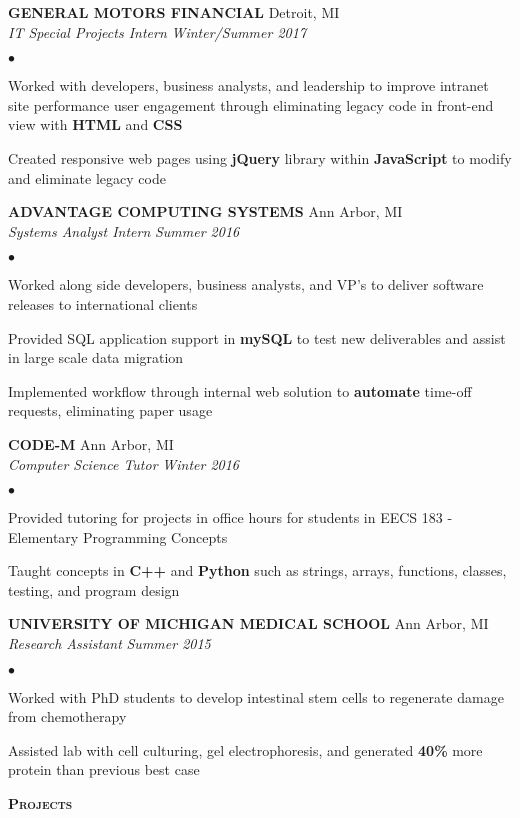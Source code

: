 \documentclass{article}
\newcommand{\lineunder}{\vspace*{-8pt} \\ \hspace*{-18pt} \hrulefill \\}
\newcommand{\header}[1]{{\hspace*{-15pt}\vspace*{6pt} \textsc{#1}} 
\vspace*{-6pt} \lineunder}
\newcommand{\employer}[4]{{ \textbf{\uppercase{#1}} \hfill#2\\ 
\emph{#3}} \hfill\textit{#4} \vspace*{1pt}}
\newenvironment{achievements}{\begin{list}{$\bullet$}{\topsep 0pt \itemsep 
-2pt}}{\vspace*{4pt}\end{list}}
\begin{document}
\employer{General Motors Financial}{Detroit, MI}
{IT Special Projects Intern}{Winter/Summer 2017}
	\begin{achievements}
	\item Worked with developers, business analysts, and leadership to improve intranet site performance user engagement through eliminating legacy code in front-end view with \textbf{HTML} and \textbf{CSS}
        \item Created responsive web pages using \textbf{jQuery} library within \textbf{JavaScript} to modify and eliminate legacy code
	\end{achievements}	

\employer{Advantage Computing Systems}{Ann Arbor, MI}
{Systems Analyst Intern}{Summer 2016}
	\begin{achievements}
	\item Worked along side developers, business analysts, and VP's to deliver software releases to international clients
	\item Provided SQL application support in \textbf{mySQL} to test new deliverables and assist in large scale data migration
	\item Implemented workflow through internal web solution to \textbf{automate} time-off requests, eliminating paper usage
	\end{achievements}
	
\employer{Code-M}{Ann Arbor, MI}
{Computer Science Tutor}{Winter 2016}
	\begin{achievements}
	\item Provided tutoring for projects in office hours for students in EECS 183 - Elementary Programming Concepts
	\item Taught concepts in \textbf{C++} and \textbf{Python} such as strings, arrays, functions, classes, testing, and program design
	\end{achievements}
	
\employer{University of Michigan Medical School}{Ann Arbor, MI}
{Research Assistant}{Summer 2015}
	\begin{achievements}
	\item Worked with PhD students to develop intestinal stem cells to regenerate damage from chemotherapy
	\item Assisted lab with cell culturing, gel electrophoresis, and generated \textbf{40\%} more protein than previous best case
	\end{achievements}
	
\header{\textbf{Projects}}
\end{document}
